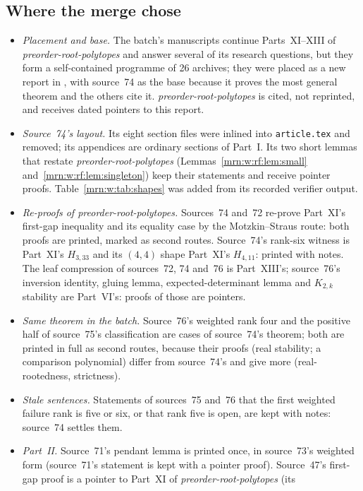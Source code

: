 \documentclass[11pt,a4paper]{article}
\theoremstyle{remark}\newtheorem{remark}[theorem]{Remark}
\newcommand{\prp}{\emph{preorder-root-polytopes}}
\begin{document}
\subsection{Where the merge chose}\label{mrn:sec:choices}
\begin{itemize}
\item \emph{Placement and base.} The batch's manuscripts continue Parts~XI--XIII
  of \prp{} and answer several of its research questions, but they form a
  self-contained programme of 26 archives; they were placed as a new report in
  , with source~74 as the base because it
  proves the most general theorem and the others cite it. \prp{} is cited,
  not reprinted, and receives dated pointers to this report.
\item \emph{Source~74's layout.} Its eight section files were inlined into
  \texttt{article.tex} and removed; its appendices are ordinary sections of
  Part~I. Its two short lemmas that restate \prp{} (Lemmas~\ref{mrn:w:rf:lem:small}
  and~\ref{mrn:w:rf:lem:singleton}) keep their statements and receive pointer
  proofs. Table~\ref{mrn:w:tab:shapes} was added from its recorded verifier
  output.
\item \emph{Re-proofs of \prp.} Sources~74 and~72 re-prove Part~XI's
  first-gap inequality and its equality case by the Motzkin--Straus route:
  both proofs are printed, marked as second routes. Source~74's rank-six
  witness is Part~XI's $H_{3,33}$ and its $(4,4)$ shape Part~XI's $H_{4,11}$:
  printed with notes. The leaf compression of sources~72, 74 and~76 is
  Part~XIII's; source~76's inversion identity, gluing lemma,
  expected-determinant lemma and $K_{2,k}$ stability are Part~VI's: proofs
  of those are pointers.
\item \emph{Same theorem in the batch.} Source~76's weighted rank four and
  the positive half of source~75's classification are cases of source~74's
  theorem; both are printed in full as second routes, because their proofs
  (real stability; a comparison polynomial) differ from source~74's and give
  more (real-rootedness, strictness).
\item \emph{Stale sentences.} Statements of sources~75 and~76 that the first
  weighted failure rank is five or six, or that rank five is open, are kept
  with notes: source~74 settles them.
\item \emph{Part~II.} Source~71's pendant lemma is printed once, in source~73's
  weighted form (source~71's statement is kept with a pointer proof).
  Source~47's first-gap proof is a pointer to Part~XI of \prp{} (its

\end{itemize}
\end{document}
